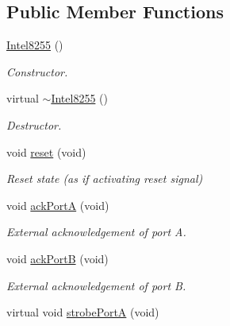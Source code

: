\subsection*{Public Member Functions}
\begin{DoxyCompactItemize}
\item 
\hypertarget{classIntel8255_acfcfa08e1078860556b34f1d66a88936}{\hyperlink{classIntel8255_acfcfa08e1078860556b34f1d66a88936}{Intel8255} ()}\label{classIntel8255_acfcfa08e1078860556b34f1d66a88936}

\begin{DoxyCompactList}\small\item\em Constructor. \end{DoxyCompactList}\item 
\hypertarget{classIntel8255_ac360700d3123005de17184d3429d047d}{virtual \hyperlink{classIntel8255_ac360700d3123005de17184d3429d047d}{$\sim$\-Intel8255} ()}\label{classIntel8255_ac360700d3123005de17184d3429d047d}

\begin{DoxyCompactList}\small\item\em Destructor. \end{DoxyCompactList}\item 
\hypertarget{classIntel8255_ad140a9c3a8dda8fc954a8f25c4d1bfca}{void \hyperlink{classIntel8255_ad140a9c3a8dda8fc954a8f25c4d1bfca}{reset} (void)}\label{classIntel8255_ad140a9c3a8dda8fc954a8f25c4d1bfca}

\begin{DoxyCompactList}\small\item\em Reset state (as if activating reset signal) \end{DoxyCompactList}\item 
\hypertarget{classIntel8255_a1a94705b45a2560e8a81cc2bd5a4275a}{void \hyperlink{classIntel8255_a1a94705b45a2560e8a81cc2bd5a4275a}{ack\-Port\-A} (void)}\label{classIntel8255_a1a94705b45a2560e8a81cc2bd5a4275a}

\begin{DoxyCompactList}\small\item\em External acknowledgement of port A. \end{DoxyCompactList}\item 
\hypertarget{classIntel8255_af08c9c489604d0eb1340f41e71a7bdc5}{void \hyperlink{classIntel8255_af08c9c489604d0eb1340f41e71a7bdc5}{ack\-Port\-B} (void)}\label{classIntel8255_af08c9c489604d0eb1340f41e71a7bdc5}

\begin{DoxyCompactList}\small\item\em External acknowledgement of port B. \end{DoxyCompactList}\item 
\hypertarget{classIntel8255_a7794eec4462ed1d6b3888b9af91445c6}{virtual void \hyperlink{classIntel8255_a7794eec4462ed1d6b3888b9af91445c6}{strobe\-Port\-A} (void)}\label{classIntel8255_a7794eec4462ed1d6b3888b9af91445c6}


\end{DoxyCompactItemize}
